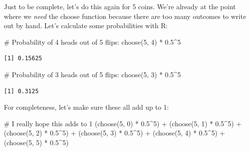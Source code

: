 \documentclass[
  letterpaper,
  DIV=11,
  numbers=noendperiod]{scrreprt}
\newenvironment{Shaded}{\begin{snugshade}}{\end{snugshade}}
\newcommand{\CommentTok}[1]{\textcolor[rgb]{0.37,0.37,0.37}{#1}}
\newcommand{\DecValTok}[1]{\textcolor[rgb]{0.68,0.00,0.00}{#1}}
\newcommand{\FloatTok}[1]{\textcolor[rgb]{0.68,0.00,0.00}{#1}}
\newcommand{\FunctionTok}[1]{\textcolor[rgb]{0.28,0.35,0.67}{#1}}
\newcommand{\NormalTok}[1]{\textcolor[rgb]{0.00,0.23,0.31}{#1}}
\newcommand{\SpecialCharTok}[1]{\textcolor[rgb]{0.37,0.37,0.37}{#1}}
\begin{document}
Just to be complete, let's do this again for 5 coins. We're already at
the point where we \emph{need} the choose function because there are too
many outcomes to write out by hand. Let's calculate some probabilities
with R:

\begin{Shaded}
\begin{Highlighting}[]
\CommentTok{\# Probability of 4 heads out of 5 flips:}
\FunctionTok{choose}\NormalTok{(}\DecValTok{5}\NormalTok{, }\DecValTok{4}\NormalTok{) }\SpecialCharTok{*} \FloatTok{0.5}\SpecialCharTok{\^{}}\DecValTok{5}
\end{Highlighting}
\end{Shaded}

\begin{verbatim}
[1] 0.15625
\end{verbatim}

\begin{Shaded}
\begin{Highlighting}[]
\CommentTok{\# Probability of 3 heads out of 5 flips:}
\FunctionTok{choose}\NormalTok{(}\DecValTok{5}\NormalTok{, }\DecValTok{3}\NormalTok{) }\SpecialCharTok{*} \FloatTok{0.5}\SpecialCharTok{\^{}}\DecValTok{5}
\end{Highlighting}
\end{Shaded}

\begin{verbatim}
[1] 0.3125
\end{verbatim}

For completeness, let's make sure these all add up to 1:

\begin{Shaded}
\begin{Highlighting}[]
\CommentTok{\# I really hope this adds to 1}
\NormalTok{(}\FunctionTok{choose}\NormalTok{(}\DecValTok{5}\NormalTok{, }\DecValTok{0}\NormalTok{) }\SpecialCharTok{*} \FloatTok{0.5}\SpecialCharTok{\^{}}\DecValTok{5}\NormalTok{) }\SpecialCharTok{+}
\NormalTok{  (}\FunctionTok{choose}\NormalTok{(}\DecValTok{5}\NormalTok{, }\DecValTok{1}\NormalTok{) }\SpecialCharTok{*} \FloatTok{0.5}\SpecialCharTok{\^{}}\DecValTok{5}\NormalTok{) }\SpecialCharTok{+}
\NormalTok{  (}\FunctionTok{choose}\NormalTok{(}\DecValTok{5}\NormalTok{, }\DecValTok{2}\NormalTok{) }\SpecialCharTok{*} \FloatTok{0.5}\SpecialCharTok{\^{}}\DecValTok{5}\NormalTok{) }\SpecialCharTok{+}
\NormalTok{  (}\FunctionTok{choose}\NormalTok{(}\DecValTok{5}\NormalTok{, }\DecValTok{3}\NormalTok{) }\SpecialCharTok{*} \FloatTok{0.5}\SpecialCharTok{\^{}}\DecValTok{5}\NormalTok{) }\SpecialCharTok{+}
\NormalTok{  (}\FunctionTok{choose}\NormalTok{(}\DecValTok{5}\NormalTok{, }\DecValTok{4}\NormalTok{) }\SpecialCharTok{*} \FloatTok{0.5}\SpecialCharTok{\^{}}\DecValTok{5}\NormalTok{) }\SpecialCharTok{+}
\NormalTok{  (}\FunctionTok{choose}\NormalTok{(}\DecValTok{5}\NormalTok{, }\DecValTok{5}\NormalTok{) }\SpecialCharTok{*} \FloatTok{0.5}\SpecialCharTok{\^{}}\DecValTok{5}\NormalTok{)}
\end{Highlighting}
\end{Shaded}
\end{document}
